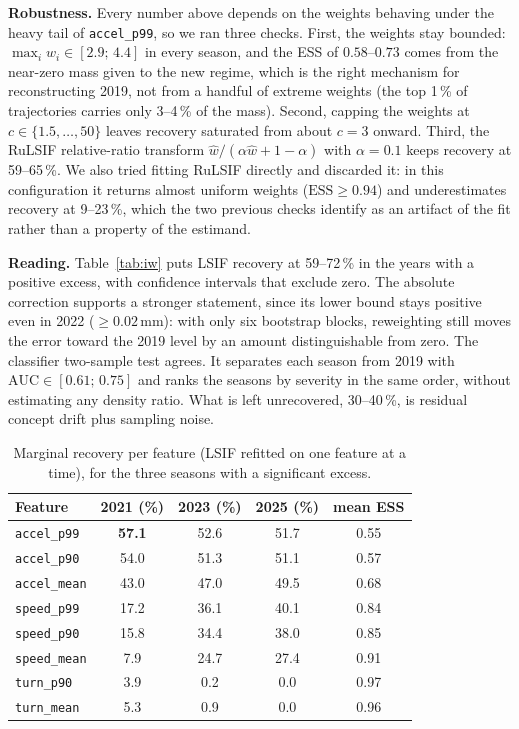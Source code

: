 \documentclass[conference]{IEEEtran}
\begin{document}
\textbf{Robustness.}
Every number above depends on the weights behaving under the heavy tail of
\texttt{accel\_p99}, so we ran three checks. First, the weights stay bounded:
$\max_i \hat{w}_i \in [2.9;\,4.4]$ in every season, and the ESS of
$0.58$--$0.73$ comes from the near-zero mass given to the new regime, which is
the right mechanism for reconstructing 2019, not from a handful of extreme
weights (the top 1\,\% of trajectories carries only 3--4\,\% of the mass).
Second, capping the weights at $c \in \{1.5,\ldots,50\}$ leaves recovery
saturated from about $c = 3$ onward. Third, the RuLSIF relative-ratio transform
$\hat{w}/(\alpha\hat{w}+1-\alpha)$ with $\alpha = 0.1$ keeps recovery at
59--65\,\%. We also tried fitting RuLSIF directly and discarded it: in this
configuration it returns almost uniform weights ($\mathrm{ESS} \geq 0.94$) and
underestimates recovery at 9--23\,\%, which the two previous checks identify as
an artifact of the fit rather than a property of the estimand.

\textbf{Reading.}
Table~\ref{tab:iw} puts LSIF recovery at 59--72\,\% in the years with a
positive excess, with confidence intervals that exclude zero. The absolute
correction supports a stronger statement, since its lower bound stays positive
even in 2022 ($\geq 0.02$\,mm): with only six bootstrap blocks, reweighting
still moves the error toward the 2019 level by an amount distinguishable from
zero. The classifier two-sample test agrees. It separates each season from 2019
with $\mathrm{AUC} \in [0.61;\,0.75]$ and ranks the seasons by severity in the
same order, without estimating any density ratio. What is left unrecovered,
30--40\,\%, is residual concept drift plus sampling noise.

\begin{table}[!t]
\centering
\caption{Marginal recovery per feature (LSIF refitted on one feature at a
time), for the three seasons with a significant excess.}
\label{tab:iwfeat}
\footnotesize
\begin{tabular}{lcccc}
\toprule
\textbf{Feature} & \textbf{2021 (\%)} & \textbf{2023 (\%)} & \textbf{2025 (\%)}
 & \textbf{mean ESS} \\
\midrule
\texttt{accel\_p99}  & \textbf{57.1} & 52.6 & 51.7 & 0.55 \\
\texttt{accel\_p90}  & 54.0          & 51.3 & 51.1 & 0.57 \\
\texttt{accel\_mean} & 43.0          & 47.0 & 49.5 & 0.68 \\
\texttt{speed\_p99}  & 17.2          & 36.1 & 40.1 & 0.84 \\
\texttt{speed\_p90}  & 15.8          & 34.4 & 38.0 & 0.85 \\
\texttt{speed\_mean} &  7.9          & 24.7 & 27.4 & 0.91 \\
\texttt{turn\_p90}   &  3.9          &  0.2 &  0.0 & 0.97 \\
\texttt{turn\_mean}  &  5.3          &  0.9 &  0.0 & 0.96 \\
\bottomrule
\end{tabular}
\end{table}
\end{document}
